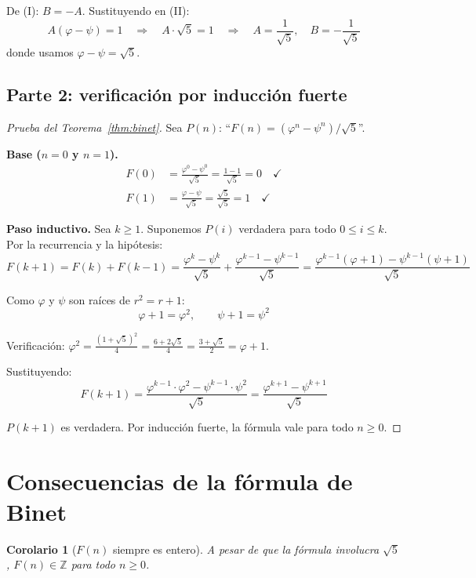 \documentclass[11pt, letterpaper]{article}
\theoremstyle{definition}
\theoremstyle{plain}
\newtheorem{corollary}[theorem]{Corolario}
\theoremstyle{remark}
\begin{document}
De (I): $B = -A$. Sustituyendo en (II):
\[
  A(\varphi - \psi) = 1
  \quad\Longrightarrow\quad
  A \cdot \sqrt{5} = 1
  \quad\Longrightarrow\quad
  A = \frac{1}{\sqrt{5}}, \quad B = -\frac{1}{\sqrt{5}}
\]
donde usamos $\varphi - \psi = \sqrt{5}$.

\subsection{Parte 2: verificación por inducción fuerte}

\begin{proof}[Prueba del Teorema~\ref{thm:binet}]
Sea $P(n)$: ``$F(n) = (\varphi^n - \psi^n)/\sqrt{5}$''.

\textbf{Base ($n = 0$ y $n = 1$).}
\begin{align*}
  F(0) &= \frac{\varphi^0 - \psi^0}{\sqrt{5}} = \frac{1 - 1}{\sqrt{5}} = 0 \quad \checkmark \\
  F(1) &= \frac{\varphi - \psi}{\sqrt{5}} = \frac{\sqrt{5}}{\sqrt{5}} = 1 \quad \checkmark
\end{align*}

\textbf{Paso inductivo.} Sea $k \geq 1$. Suponemos $P(i)$ verdadera
para todo $0 \leq i \leq k$. Por la recurrencia y la hipótesis:
\[
  F(k+1) = F(k) + F(k-1)
  = \frac{\varphi^k - \psi^k}{\sqrt{5}}
  + \frac{\varphi^{k-1} - \psi^{k-1}}{\sqrt{5}}
  = \frac{\varphi^{k-1}(\varphi + 1) - \psi^{k-1}(\psi + 1)}{\sqrt{5}}
\]

Como $\varphi$ y $\psi$ son raíces de $r^2 = r + 1$:
\[
  \varphi + 1 = \varphi^2, \qquad \psi + 1 = \psi^2
\]

Verificación: $\varphi^2 = \frac{(1+\sqrt{5})^2}{4} = \frac{6+2\sqrt{5}}{4} = \frac{3+\sqrt{5}}{2} = \varphi + 1$. \checkmark

Sustituyendo:
\[
  F(k+1) = \frac{\varphi^{k-1} \cdot \varphi^2 - \psi^{k-1} \cdot \psi^2}{\sqrt{5}}
  = \frac{\varphi^{k+1} - \psi^{k+1}}{\sqrt{5}}
\]

$P(k+1)$ es verdadera. Por inducción fuerte, la fórmula vale para
todo $n \geq 0$.
\end{proof}

\section{Consecuencias de la fórmula de Binet}

\begin{corollary}[$F(n)$ siempre es entero]\label{cor:integer}
A pesar de que la fórmula involucra $\sqrt{5}$, $F(n) \in \mathbb{Z}$
para todo $n \geq 0$.
\end{corollary}
\end{document}
